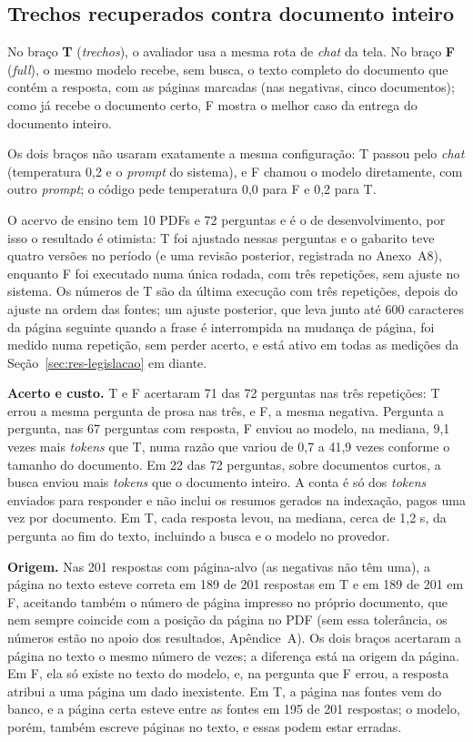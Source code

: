 \documentclass[12pt]{article}
\begin{document}
\subsection{Trechos recuperados contra documento inteiro}
\label{sec:res-geracao}

No braço \textbf{T} (\emph{trechos}), o avaliador usa a mesma rota de \emph{chat} da tela. No braço \textbf{F} (\emph{full}), o mesmo modelo recebe, sem busca, o texto completo do documento que contém a resposta, com as páginas marcadas (nas negativas, cinco documentos); como já recebe o documento certo, F mostra o melhor caso da entrega do documento inteiro.

Os dois braços não usaram exatamente a mesma configuração: T passou pelo \emph{chat} (temperatura 0,2 e o \emph{prompt} do sistema), e F chamou o modelo diretamente, com outro \emph{prompt}; o código pede temperatura 0,0 para F e 0,2 para T.

O acervo de ensino tem 10 PDFs e 72 perguntas e é o de desenvolvimento, por isso o resultado é otimista: T foi ajustado nessas perguntas e o gabarito teve quatro versões no período (e uma revisão posterior, registrada no Anexo~A8), enquanto F foi executado numa única rodada, com três repetições, sem ajuste no sistema. Os números de T são da última execução com três repetições, depois do ajuste na ordem das fontes; um ajuste posterior, que leva junto até 600 caracteres da página seguinte quando a frase é interrompida na mudança de página, foi medido numa repetição, sem perder acerto, e está ativo em todas as medições da Seção~\ref{sec:res-legislacao} em diante.

\textbf{Acerto e custo.} T e F acertaram 71 das 72 perguntas nas três repetições: T errou a mesma pergunta de prosa nas três, e F, a mesma negativa. Pergunta a pergunta, nas 67 perguntas com resposta, F enviou ao modelo, na mediana, 9,1 vezes mais \emph{tokens} que T, numa razão que variou de 0,7 a 41,9 vezes conforme o tamanho do documento. Em 22 das 72 perguntas, sobre documentos curtos, a busca enviou mais \emph{tokens} que o documento inteiro. A conta é só dos \emph{tokens} enviados para responder e não inclui os resumos gerados na indexação, pagos uma vez por documento. Em T, cada resposta levou, na mediana, cerca de 1,2 s, da pergunta ao fim do texto, incluindo a busca e o modelo no provedor.

\textbf{Origem.} Nas 201 respostas com página-alvo (as negativas não têm uma), a página no texto esteve correta em 189 de 201 respostas em T e em 189 de 201 em F, aceitando também o número de página impresso no próprio documento, que nem sempre coincide com a posição da página no PDF (sem essa tolerância, os números estão no apoio dos resultados, Apêndice~A). Os dois braços acertaram a página no texto o mesmo número de vezes; a diferença está na origem da página. Em F, ela só existe no texto do modelo, e, na pergunta que F errou, a resposta atribui a uma página um dado inexistente. Em T, a página nas fontes vem do banco, e a página certa esteve entre as fontes em 195 de 201 respostas; o modelo, porém, também escreve páginas no texto, e essas podem estar erradas.
\end{document}
